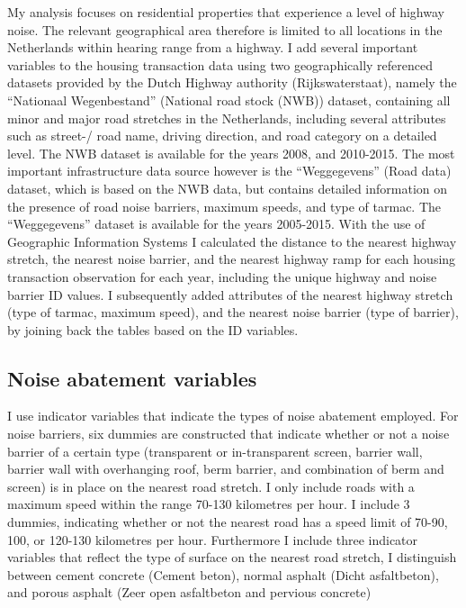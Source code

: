 \documentclass[12pt]{scrartcl}
\begin{document}
	My analysis focuses on residential properties that experience a level of highway noise. The relevant geographical area therefore is limited to all locations in the Netherlands within hearing range from a highway. I add several important variables to the housing transaction data using two geographically referenced datasets provided by the Dutch Highway authority (Rijkswaterstaat), namely the ``Nationaal Wegenbestand'' (National road stock (NWB)) dataset, containing all minor and major road stretches in the Netherlands, including several attributes such as street-/ road name, driving direction, and road category on a detailed level. The NWB dataset is available for the years 2008, and 2010-2015. The most important infrastructure data source however is the ``Weggegevens'' (Road data) dataset, which is based on the NWB data, but contains detailed information on the presence of road noise barriers, maximum speeds, and type of tarmac. The ``Weggegevens'' dataset is available for the years 2005-2015. With the use of Geographic Information Systems I calculated the distance to the nearest highway stretch, the nearest noise barrier, and the nearest highway ramp for each housing transaction observation for each year, including the unique highway and noise barrier ID values. I subsequently added attributes of the nearest highway stretch (type of tarmac, maximum speed), and the nearest noise barrier (type of barrier), by joining back the tables based on the ID variables.
		
		\subsection{Noise abatement variables}
		I use indicator variables that indicate the types of noise abatement employed. For noise barriers, six dummies are constructed that indicate whether or not a noise barrier of a certain type (transparent or in-transparent screen, barrier wall, barrier wall with overhanging roof, berm barrier, and combination of berm and screen) is in place on the nearest road stretch. I only include roads with a maximum speed within the range 70-130 kilometres per hour. I include 3 dummies, indicating whether or not the nearest road has a speed limit of 70-90, 100, or 120-130 kilometres per hour. Furthermore I include three indicator variables that reflect the type of surface on the nearest road stretch, I distinguish between cement concrete (Cement beton), normal asphalt (Dicht asfaltbeton), and porous asphalt (Zeer open asfaltbeton and pervious concrete)
			
\end{document}
